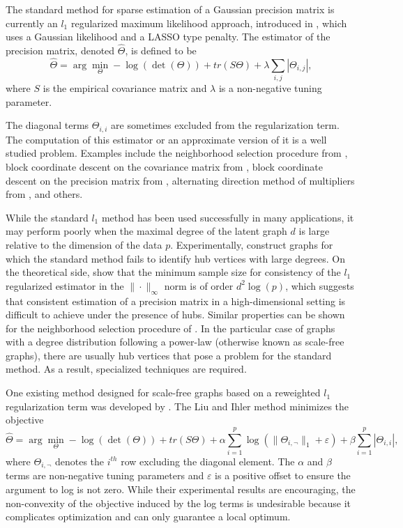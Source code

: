 \documentclass{uwstat572}
\theoremstyle{remark}
\theoremstyle{definition}
\begin{document}
The standard method for sparse estimation of a Gaussian precision matrix is currently an $l_1$ regularized maximum likelihood approach, introduced in \cite{Yuan2007}, which uses a Gaussian likelihood and a LASSO type penalty.  The estimator of the precision matrix, denoted $\widehat{\Theta}$, is defined to be
\begin{equation}\label{glasso}
    \widehat{\Theta} = \arg\min_{\Theta} -\log( \det( \Theta)) + tr(S \Theta) + \lambda \sum_{i, j} |\Theta_{i,j}|,
\end{equation}
where $S$ is the empirical covariance matrix and $\lambda$ is a non-negative tuning parameter. 

The diagonal terms $\Theta_{i,i}$ are sometimes excluded from the regularization term. The computation of this estimator or an approximate version of it is a well studied problem.  Examples include the neighborhood selection procedure from \cite{meinshausen2006}, block coordinate descent on the covariance matrix from \cite{Banerjee2008}, block coordinate descent on the precision matrix from \cite{Friedman2008}, alternating direction method of multipliers from \cite{Boyd2011}, and others.

While the standard $l_1$ method has been used successfully in many applications, it may perform poorly when the maximal degree of the latent graph $d$ is large relative to the dimension of the data $p$. Experimentally, \cite{Schaefer2005} construct graphs for which the standard method fails to identify hub vertices with large degrees. 
On the theoretical side, \cite{ravikumar2011} show that the minimum sample size for consistency of the $l_1$ regularized estimator in the $\| \cdot \|_{\infty}$ norm is of order $d^2 \log(p)$, which suggests that consistent estimation of a precision matrix in a high-dimensional setting is difficult to achieve under the presence of hubs. 
Similar properties can be shown for the neighborhood selection procedure of \cite{meinshausen2006}.  In the particular case of graphs with a degree distribution following a power-law (otherwise known as scale-free graphs), there are usually hub vertices that pose a problem for the standard method.  As a result, specialized techniques are required.

One existing method designed for scale-free graphs based on a reweighted $l_1$ regularization term was developed by \cite{liu11c}.  The Liu and Ihler method minimizes the objective
\begin{equation*}
    \widehat{\Theta} = \arg\min_{\Theta}  -\log( \det( \Theta)) + tr(S \Theta) + \alpha \sum_{i=1}^p \log( \| \Theta_{i,\neg}\|_1 + \varepsilon ) + \beta \sum_{i=1}^p |\Theta_{i,i}|,
\end{equation*}
where $\Theta_{i,\neg}$ denotes the $i^{th}$ row excluding the diagonal element.  The $\alpha$ and $\beta$ terms are non-negative tuning parameters and $\varepsilon$ is a positive offset to ensure the argument to log is not zero. While their experimental results are encouraging, the non-convexity of the objective induced by the log terms is undesirable because it complicates optimization and can only guarantee a local optimum.
\end{document}
